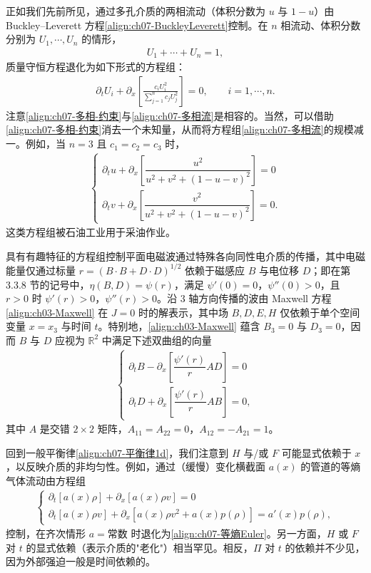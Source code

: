 \documentclass[../../main.tex]{subfiles}
\begin{document}
正如我们先前所见，通过多孔介质的两相流动（体积分数为 $u$ 与 $1-u$）由 Buckley--Leverett 方程\eqref{align:ch07-BuckleyLeverett}控制。在 $n$ 相流动、体积分数分别为 $U_1,\cdots,U_n$ 的情形，
\begin{align}
U_1+\cdots+U_n=1,
\label{align:ch07-多相-约束}
\end{align}
质量守恒方程退化为如下形式的方程组：
\begin{align}
\partial_t U_i+\partial_x\left[\frac{c_i U_i^2}{\sum_{j=1}^n c_j U_j^2}\right]=0,\qquad i=1,\cdots,n.
\label{align:ch07-多相流}
\end{align}
注意\eqref{align:ch07-多相-约束}与\eqref{align:ch07-多相流}是相容的。当然，可以借助\eqref{align:ch07-多相-约束}消去一个未知量，从而将方程组\eqref{align:ch07-多相流}的规模减一。例如，当 $n=3$ 且 $c_1=c_2=c_3$ 时，
\begin{align}
\begin{cases}
\partial_t u+\partial_x\left[\dfrac{u^2}{u^2+v^2+(1-u-v)^2}\right]=0\\
\partial_t v+\partial_x\left[\dfrac{v^2}{u^2+v^2+(1-u-v)^2}\right]=0.
\end{cases}
\label{align:ch07-三相流}
\end{align}
这类方程组被石油工业用于采油作业。

具有有趣特征的方程组控制平面电磁波通过特殊各向同性电介质的传播，其中电磁能量仅通过标量 $r=(B\cdot B+D\cdot D)^{1/2}$ 依赖于磁感应 $B$ 与电位移 $D$；即在第 3.3.8 节的记号中，$\eta(B,D)=\psi(r)$，满足 $\psi'(0)=0$，$\psi''(0)>0$，且 $r>0$ 时 $\psi'(r)>0$，$\psi''(r)>0$。沿 $3$ 轴方向传播的波由 Maxwell 方程\eqref{align:ch03-Maxwell}
在 $J=0$ 时的解表示，其中场 $B,D,E,H$ 仅依赖于单个空间变量 $x=x_3$ 与时间 $t$。特别地，\eqref{align:ch03-Maxwell}
蕴含 $B_3=0$ 与 $D_3=0$，因而 $B$ 与 $D$ 应视为 $\mathbb{R}^2$ 中满足下述双曲组的向量
\begin{align}
\begin{cases}
\partial_t B-\partial_x\left[\dfrac{\psi'(r)}{r}AD\right]=0\\
\partial_t D+\partial_x\left[\dfrac{\psi'(r)}{r}AB\right]=0,
\end{cases}
\label{align:ch07-电磁波}
\end{align}
其中 $A$ 是交错 $2\times2$ 矩阵，$A_{11}=A_{22}=0$，$A_{12}=-A_{21}=1$。

回到一般平衡律\eqref{align:ch07-平衡律1d}，我们注意到 $H$ 与/或 $F$ 可能显式依赖于 $x$，以反映介质的非均匀性。例如，通过（缓慢）变化横截面 $a(x)$ 的管道的等熵气体流动由方程组
\begin{align}
\begin{cases}
\partial_t[a(x)\rho]+\partial_x[a(x)\rho v]=0\\
\partial_t[a(x)\rho v]+\partial_x[a(x)\rho v^2+a(x)p(\rho)]=a'(x)p(\rho),
\end{cases}
\label{align:ch07-变截面管道}
\end{align}
控制，在齐次情形 $a=\text{常数}$ 时退化为\eqref{align:ch07-等熵Euler}。另一方面，$H$ 或 $F$ 对 $t$ 的显式依赖（表示介质的"老化"）相当罕见。相反，$\Pi$ 对 $t$ 的依赖并不少见，因为外部强迫一般是时间依赖的。
\end{document}
